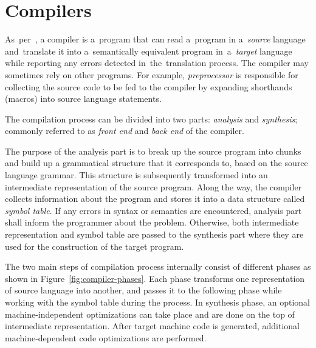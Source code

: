 \documentclass[
  digital, %
  table,   %
  lof,     %
  lot,     %
  oneside,
]{fithesis3}
\begin{document}
\chapter{Compilers}
\label{chap:compilers}
As~per~\cite{dragon-book}, a compiler is a~program that can read a~program in a~\textit{source} language and~translate it into a~semantically equivalent program in~a~\textit{target} language while reporting any errors detected in~the~translation process. The compiler may sometimes rely on other programs. For example, \textit{preprocessor} is responsible for collecting the source code to be fed to the compiler by expanding shorthands (macros) into source language statements. 

The compilation process can be divided into two parts: \textit{analysis} and \textit{synthesis}; commonly referred to as \textit{front end} and \textit{back end} of the compiler.

The purpose of the analysis part is to break up the source program into chunks and build up a grammatical structure that it corresponds to, based on the source language grammar. This structure is subsequently transformed into an intermediate representation of the source program. Along the way, the compiler collects information about the program and stores it into a data structure called \textit{symbol table}. If any errors in syntax or semantics are encountered, analysis part shall inform the programmer about the problem. Otherwise, both intermediate representation and symbol table are passed to the synthesis part where they are used for the construction of the target program.

The two main steps of compilation process internally consist of different phases as shown in Figure~\ref{fig:compiler-phases}. Each phase transforms one representation of source language into another, and passes it to the following phase while working with the symbol table during the process. In synthesis phase, an optional machine-independent optimizations can take place and are done on the top of intermediate representation. After target machine code is generated, additional machine-dependent code optimizations are performed.
\end{document}

